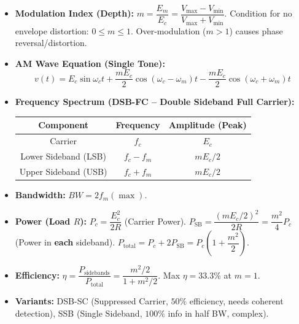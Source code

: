 \documentclass[11pt]{article}
\begin{document}
\begin{propriete}
\begin{itemize}
\item \textbf{Modulation Index (Depth):} $m = \dfrac{E_m}{E_c} = \dfrac{V_{\max} - V_{\min}}{V_{\max} + V_{\min}}$. Condition for no envelope distortion: $0 \le m \le 1$. Over-modulation ($m>1$) causes phase reversal/distortion.
\item \textbf{AM Wave Equation (Single Tone):}
\[
v(t) = E_c \sin \omega_c t + \frac{mE_c}{2} \cos(\omega_c - \omega_m)t - \frac{mE_c}{2} \cos(\omega_c + \omega_m)t
\]
\item \textbf{Frequency Spectrum (DSB-FC -- Double Sideband Full Carrier):}
\begin{center}
\begin{tabular}{|c|c|c|}
\hline
\textbf{Component} & \textbf{Frequency} & \textbf{Amplitude (Peak)} \\ \hline
Carrier & $f_c$ & $E_c$ \\ \hline
Lower Sideband (LSB) & $f_c - f_m$ & $mE_c/2$ \\ \hline
Upper Sideband (USB) & $f_c + f_m$ & $mE_c/2$ \\ \hline
\end{tabular}
\end{center}
\item \textbf{Bandwidth:} $BW = 2 f_m(\max)$.
\item \textbf{Power (Load $R$):}
$P_c = \dfrac{E_c^2}{2R}$ (Carrier Power).
$P_{\mathrm{SB}} = \dfrac{(mE_c/2)^2}{2R} = \dfrac{m^2}{4} P_c$ (Power in \textbf{each} sideband).
$P_{\mathrm{total}} = P_c + 2P_{\mathrm{SB}} = P_c \left(1 + \dfrac{m^2}{2}\right)$.
\item \textbf{Efficiency:} $\eta = \dfrac{P_{\mathrm{sidebands}}}{P_{\mathrm{total}}} = \dfrac{m^2/2}{1 + m^2/2}$. Max $\eta = 33.3\%$ at $m=1$.
\item \textbf{Variants:} DSB-SC (Suppressed Carrier, $50\%$ efficiency, needs coherent detection), SSB (Single Sideband, $100\%$ info in half BW, complex).
\end{itemize}
\end{propriete}
\end{document}

